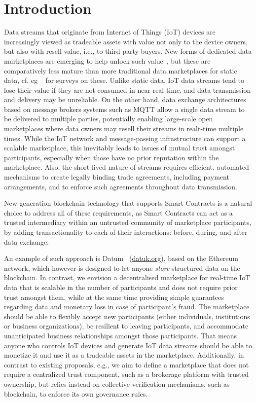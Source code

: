 \documentclass[letterpaper, 10 pt, conference]{ieeeconf}  %
\begin{document}
\section{Introduction}  \label{sec:intro}

Data streams that originate from Internet of Things (IoT) devices are increasingly viewed as tradeable assets with value not only to the device owners, but also with resell value, i.e., to third party buyers. 
New forms of dedicated data marketplaces are emerging to help unlock such value~\cite{misura}, but these are comparatively less mature than more traditional data marketplaces for static data, cf. eg ~\cite{7004800,Schomm2013} for surveys on these.
Unlike static data,  IoT data streams tend to lose their value if they are not consumed in near-real time, and data transmission and delivery may be unreliable. 
On the other hand, data exchange architectures based on message brokers systems such as MQTT allow a single data stream to be delivered to multiple parties, potentially enabling large-scale  open marketplaces where data owners may resell their streams in realt-time multiple times.
While the IoT network and message-passing infrastructure can support a scalable marketplace, this inevitably leads to issues of mutual trust amongst participants, especially when those have no prior reputation within the marketplace. Also, the short-lived nature of streams requires efficient, automated mechanisms to create legally binding trade agreements, including payment arrangements, and to enforce such agreements throughout data transmission.

New generation blockchain technology that supports Smart Contracts is a natural choice to address all of these requirements, as Smart Contracts can act as a trusted intermediary within an untrusted community of marketplace participants, by adding transactionality to each of their interactions: before, during, and after data exchange.

An example of such approach is Datum~\cite{Haenni2017} (\url{datuk.org}), based on the Ethereum network, which however is designed to let anyone \textit{store} structured data on the blockchain.
In contrast, we envision a decentralised marketplace for real-time IoT data that is scalable in the number of participants and does not require prior trust amongst them, while at the same time providing simple guarantees regarding data and monetary loss in case of participant's fraud.
The marketplace should be able to flexibly accept new participants (either individuals, institutions or business organizations), be resilient to leaving participants, and accommodate unanticipated business relationships amongst those participants. That means anyone who controls IoT devices and generate IoT data streams should be able to monetize it and use it as a tradeable assets in the marketplace.
Additionally, in contrast to existing proposals, e.g.\cite{Cao:2016:MMR:2926746.2883611}, we aim to define a marketplace that does not require a centralized trust component, such as a brokerage platform with trusted ownership, but relies instead on collective verification mechanisms, such as blockchain, to enforce its own governance rules.
\end{document}
